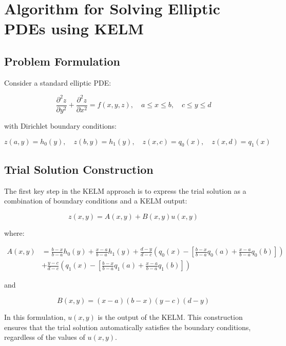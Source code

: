 \documentclass[11pt,a4paper]{article}
\begin{document}
\section{Algorithm for Solving Elliptic PDEs using KELM}

\subsection{Problem Formulation}
Consider a standard elliptic PDE:

\begin{equation}
\frac{\partial^2 z}{\partial y^2} + \frac{\partial^2 z}{\partial x^2} = f(x, y, z), \quad a \leq x \leq b, \quad c \leq y \leq d
\end{equation}

with Dirichlet boundary conditions:

\begin{equation}
z(a, y) = h_0(y), \quad z(b, y) = h_1(y), \quad z(x, c) = q_0(x), \quad z(x, d) = q_1(x)
\end{equation}

\subsection{Trial Solution Construction}
The first key step in the KELM approach is to express the trial solution as a combination of boundary conditions and a KELM output:

\begin{equation}
z(x, y) = A(x, y) + B(x, y)u(x, y)
\end{equation}

where:

\begin{align}
A(x, y) &= \frac{b-x}{b-a}h_0(y) + \frac{x-a}{b-a}h_1(y) + \frac{d-y}{d-c}\left(q_0(x) - \left[\frac{b-x}{b-a}q_0(a) + \frac{x-a}{b-a}q_0(b)\right]\right) \nonumber \\
&+ \frac{y-c}{d-c}\left(q_1(x) - \left[\frac{b-x}{b-a}q_1(a) + \frac{x-a}{b-a}q_1(b)\right]\right)
\end{align}

and 

\begin{equation}
B(x, y) = (x-a)(b-x)(y-c)(d-y)
\end{equation}

In this formulation, $u(x,y)$ is the output of the KELM. This construction ensures that the trial solution automatically satisfies the boundary conditions, regardless of the values of $u(x,y)$.
\end{document}
